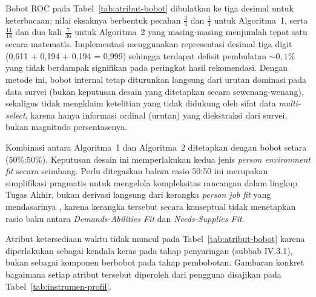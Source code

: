 Bobot ROC pada Tabel~\ref{tab:atribut-bobot} dibulatkan ke tiga desimal untuk keterbacaan; nilai eksaknya berbentuk pecahan $\frac{3}{4}$ dan $\frac{1}{4}$ untuk Algoritma~1, serta $\frac{11}{18}$ dan dua kali $\frac{7}{36}$ untuk Algoritma~2 yang masing-masing menjumlah tepat satu secara matematis. Implementasi menggunakan representasi desimal tiga digit (0,611 + 0,194 + 0,194 = 0,999) sehingga terdapat defisit pembulatan ${\sim}0{,}1\%$ yang tidak berdampak signifikan pada peringkat hasil rekomendasi. Dengan metode ini, bobot internal tetap diturunkan langsung dari urutan dominasi pada data survei (bukan keputusan desain yang ditetapkan secara sewenang-wenang), sekaligus tidak mengklaim ketelitian yang tidak didukung oleh sifat data \emph{multi-select}, karena hanya informasi ordinal (urutan) yang diekstraksi dari survei, bukan magnitudo persentasenya.

Kombinasi antara Algoritma~1 dan Algoritma~2 ditetapkan dengan bobot setara (50\%:50\%). Keputusan desain ini memperlakukan kedua jenis \emph{person environment fit} secara seimbang. Perlu ditegaskan bahwa rasio 50:50 ini merupakan simplifikasi pragmatis untuk mengelola kompleksitas rancangan dalam lingkup Tugas Akhir, bukan derivasi langsung dari kerangka \emph{person job fit} yang mendasarinya \autocite{langgeng2021}, karena kerangka tersebut secara konseptual tidak menetapkan rasio baku antara \emph{Demands-Abilities Fit} dan \emph{Needs-Supplies Fit}.

Atribut ketersediaan waktu tidak muncul pada Tabel~\ref{tab:atribut-bobot} karena diperlakukan sebagai kendala keras pada tahap penyaringan (subbab IV.3.1), bukan sebagai komponen berbobot pada tahap pembobotan. Gambaran konkret bagaimana setiap atribut tersebut diperoleh dari pengguna disajikan pada Tabel~\ref{tab:instrumen-profil}.

